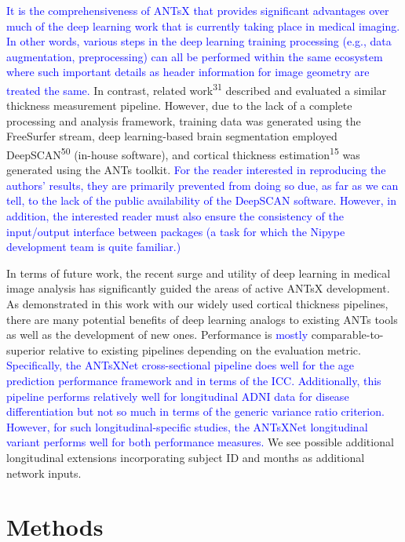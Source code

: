 \documentclass[12pt,]{article}
\begin{document}
\textcolor{blue}{It is the comprehensiveness of ANTsX that provides significant
advantages over much of the deep learning work that is currently taking place in
medical imaging. In other words, various steps in the deep learning training
processing (e.g., data augmentation, preprocessing) can all be performed within
the same ecosystem where such important details as header information for image
geometry are treated the same.} In contrast, related
work\textsuperscript{31} described and evaluated a similar thickness
measurement pipeline. However, due to the lack of a complete processing
and analysis framework, training data was generated using the FreeSurfer
stream, deep learning-based brain segmentation employed
DeepSCAN\textsuperscript{50} (in-house software), and cortical thickness
estimation\textsuperscript{15} was generated using the ANTs toolkit.
\textcolor{blue}{For the reader interested in reproducing the authors' results,
they are primarily prevented from doing so due, as far as we can tell, to the
lack of the public availability of the DeepSCAN software. However, in addition,
the interested reader must also ensure the consistency of the input/output
interface between packages (a task for which the Nipype development team is
quite familiar.)}

In terms of future work, the recent surge and utility of deep learning
in medical image analysis has significantly guided the areas of active
ANTsX development. As demonstrated in this work with our widely used
cortical thickness pipelines, there are many potential benefits of deep
learning analogs to existing ANTs tools as well as the development of
new ones. Performance is \textcolor{blue}{mostly} comparable-to-superior
relative to existing pipelines depending on the evaluation metric.
\textcolor{blue}{Specifically, the ANTsXNet
cross-sectional pipeline does well for the age prediction performance framework
and in terms of the ICC.  Additionally, this pipeline performs relatively well
for longitudinal ADNI data for disease differentiation but not so much in terms
of the generic variance ratio criterion.  However, for such longitudinal-specific
studies, the ANTsXNet longitudinal variant performs well for both performance
measures.} We see possible additional longitudinal extensions
incorporating subject ID and months as additional network inputs.

\hypertarget{methods}{%
\section*{Methods}\label{methods}}
\end{document}
